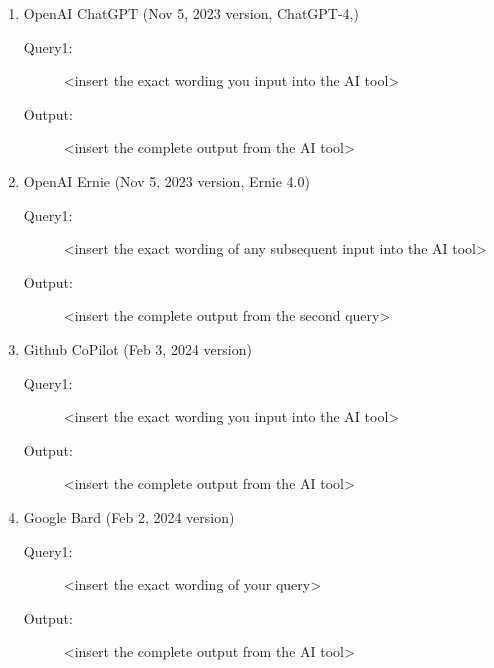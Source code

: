 \documentclass{mcmthesis}
\begin{document}
\begin{enumerate}   %
\item OpenAI ChatGPT (Nov 5, 2023 version, ChatGPT-4,)  %
\begin{description}     %
\item[Query1:] <insert the exact wording you input into the AI tool> 
\item[Output:] <insert the complete output from the AI tool>
\end{description}
\item OpenAI Ernie (Nov 5, 2023 version, Ernie 4.0) 
\begin{description}
\item[Query1:] <insert the exact wording of any subsequent input into the AI tool> 
\item[Output:] <insert the complete output from the second query>
\end{description}
\item Github CoPilot (Feb 3, 2024 version) 
\begin{description}
\item[Query1:] <insert the exact wording you input into the AI tool> 
\item[Output:] <insert the complete output from the AI tool>
\end{description}
\item Google Bard (Feb 2, 2024 version) 
\begin{description}
\item[Query1:] <insert the exact wording of your query> 
\item[Output:] <insert the complete output from the AI tool>
\end{description}
\end{enumerate}
    
\clearpage  %
\setcounter{page}{\value{lastpage}}    
    
\end{document}
